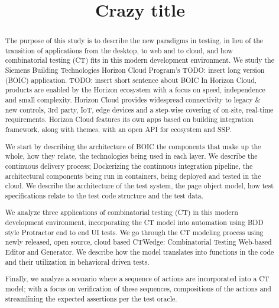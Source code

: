 \documentclass[conference]{IEEEtran}
\newcommand{\todo}[1]{}
\renewcommand{\todo}[1]{{\color{red} TODO: {#1}}}
\begin{document}
\title{Crazy title}


\author{
}

\maketitle


\begin{abstract}
The purpose of this study is to describe the new paradigms in testing,
in lieu of the transition of applications from the desktop, to web and to cloud, and how combinatorial testing (CT) fits in this modern development environment. 
We study the Siemens Building Technologies Horizon Cloud Program's \todo{insert long version} (BOIC) application. \todo{ insert short sentence about BOIC}
In Horizon Cloud, products are enabled by the Horizon ecosystem with a focus on speed, independence and small complexity.
Horizon Cloud provides widespread connectivity to legacy \& new controls, 3rd party, IoT, 
edge devices and a step-wise covering of on-site, real-time requirements. 
Horizon Cloud features its own apps based on building integration framework, along with themes, with an open API for ecosystem and SSP. 

We start by describing the architecture of BOIC the components that make up the whole, how they relate, the technologies being used in each layer. 
We describe the continuous delivery process; Dockerizing the continuous integration pipeline,
the architectural components being run in containers, being deployed and tested in the cloud. 
We describe the architecture of the test system, the page object model, how test specifications relate to the test code structure and the test data. 

We analyze three applications of combinatorial testing (CT) in this modern development environment,
incorporating the CT model into automation using BDD style Protractor end to end UI tests. 
We go through the CT modeling process using newly released, open source, cloud based CTWedge: Combinatorial Testing Web-based Editor and Generator. 
We describe how the model translates into functions in the code and their utilization in behavioral driven tests.

Finally, we analyze a scenario where a sequence of actions are incorporated into a CT model;
with a focus on verification of these sequences, compositions of the actions and streamlining the expected assertions per the test oracle.

\end{abstract}
\end{document}
